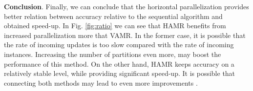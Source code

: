 \documentclass[journal]{IEEEtran}
\begin{document}
\begin{table}[h]
	\captionsetup{name=Tab}
	\caption{Computing time [s] for SAMR and \textbf{speed-up} when running HAMR with different numbers of partitions P.}
	\centering
	\label{tab:time_horizontal}
\end{table}

\medskip
\noindent\textbf{Conclusion}. Finally, we can conclude that the horizontal parallelization provides better relation between accuracy relative to the sequential algorithm and obtained speed-up. In Fig. \ref{fig:ratio} we can see that HAMR benefits from increased parallelization more that VAMR. In the former case, it is possible that the rate of incoming updates is too slow compared with the rate of incoming instances. Increasing the number of partitions even more, may boost the performance of this method. On the other hand, HAMR keeps accuracy on a relatively stable level, while providing significant speed-up. It is possible that connecting both methods may lead to even more improvements \cite{Vu:2014}. 
\end{document}
